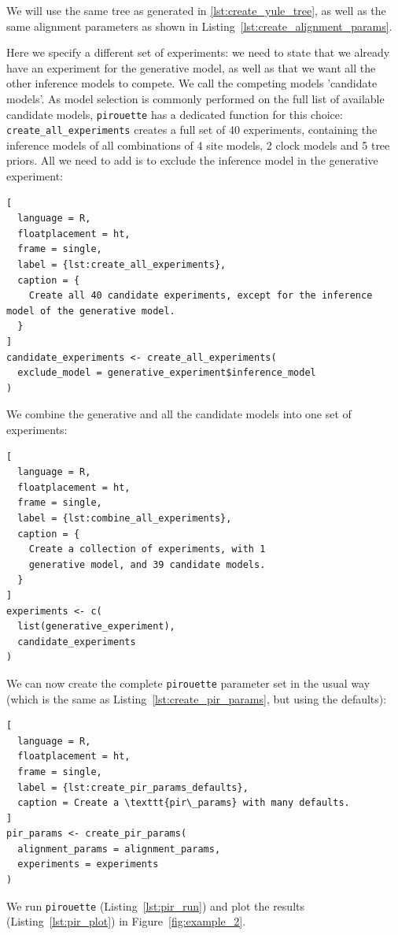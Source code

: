 We will use the same tree as generated in \ref{lst:create_yule_tree}, as well 
as the same alignment parameters as shown 
in Listing~\ref{lst:create_alignment_params}.

Here we specify a different set of experiments: we
need to state that we already have an experiment for
the generative model, as well as that we want all the other inference models 
to compete. We call the competing models 'candidate models'.
As model selection is commonly performed on the full list of available 
candidate models, \verb;pirouette; has a dedicated function 
for this choice: \verb;create_all_experiments; creates a full set 
of 40 experiments, 
containing the inference models of all combinations of 4 site models, 
2 clock models and 5 tree priors. All we need to add is to exclude the 
inference model in the generative experiment:

\begin{lstlisting}[
  language = R, 
  floatplacement = ht, 
  frame = single, 
  label = {lst:create_all_experiments},
  caption = {
    Create all 40 candidate experiments, except for the inference model of the generative model.
  }
]
candidate_experiments <- create_all_experiments(
  exclude_model = generative_experiment$inference_model
)
\end{lstlisting}

We combine the generative and all the candidate models into one set of 
experiments:

\begin{lstlisting}[
  language = R, 
  floatplacement = ht, 
  frame = single, 
  label = {lst:combine_all_experiments},
  caption = {
    Create a collection of experiments, with 1
    generative model, and 39 candidate models.
  }
]
experiments <- c(
  list(generative_experiment),
  candidate_experiments
)
\end{lstlisting}

We can now create the complete \verb;pirouette; parameter set in the usual 
way (which is the same as Listing~\ref{lst:create_pir_params}, but using the 
defaults):

\begin{lstlisting}[
  language = R,
  floatplacement = ht,
  frame = single,
  label = {lst:create_pir_params_defaults},
  caption = Create a \texttt{pir\_params} with many defaults.
]
pir_params <- create_pir_params(
  alignment_params = alignment_params,
  experiments = experiments
)
\end{lstlisting}

We run \verb;pirouette; (Listing~\ref{lst:pir_run}) 
and plot the results (Listing~\ref{lst:pir_plot}) in Figure~\ref{fig:example_2}.

